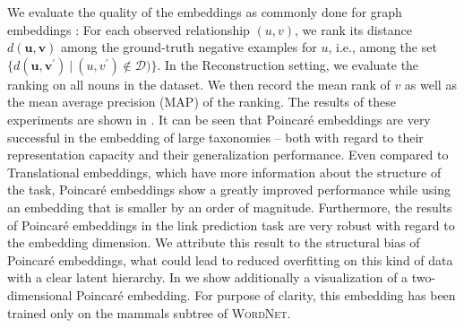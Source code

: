 \documentclass[11pt]{article}
\renewcommand{\vec}[1]{\bm{#1}}
\newcommand{\vu}{\vec{u}}
\newcommand{\vv}{\vec{v}}
\newcommand{\Set}[1]{\mathcal{#1}}
\newcommand{\method}[1]{\textsc{#1}\xspace}
\begin{document}
We evaluate the quality of the embeddings as commonly done for graph embeddings
\cite{DBLP:conf/nips/BordesUGWY13,kgs/nickel2016holographic}: For each observed
relationship \((u, v)\), we rank its distance \(d(\vu,\vv)\) among the ground-truth
negative examples for \(u\), i.e., among the set \({\{d(\vu, \vv^\prime)\ |\ (u,
v^\prime) \not \in \Set{D})\}}\). In the Reconstruction setting, we evaluate the
ranking on all nouns in the dataset. We then record the mean rank of \(v\) as well
as the mean average precision (MAP) of the ranking. The results of these
experiments are shown in . It can be seen that
Poincaré embeddings are very successful in the embedding of large taxonomies --
both with regard to their representation capacity and their generalization
performance. Even compared to Translational embeddings, which have more
information about the structure of the task, Poincaré embeddings show a greatly
improved performance while using an embedding that is smaller by an order of
magnitude. Furthermore, the results of Poincaré embeddings in the link
prediction task are very robust with regard to the embedding dimension.
We attribute this result to the structural bias of Poincaré embeddings, what
could lead to reduced overfitting on this kind of data with a clear latent
hierarchy. In  we show additionally a visualization of a
two-dimensional Poincaré embedding. For purpose of clarity, this embedding has
been trained only on the mammals subtree of \method{WordNet}.
\end{document}
